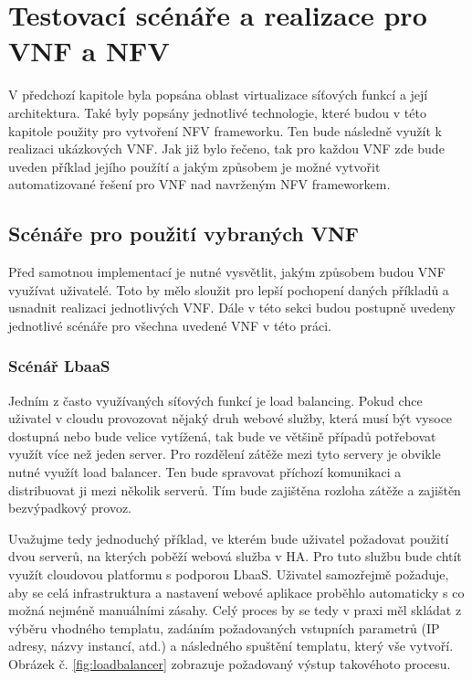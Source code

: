 \chapter{Testovací scénáře a realizace pro VNF a NFV}

V předchozí kapitole byla popsána oblast virtualizace síťových funkcí a její architektura. Také byly popsány jednotlivé technologie, které budou v této kapitole použity pro vytvoření NFV frameworku. Ten bude následně využít k realizaci ukázkových VNF. Jak již bylo řečeno, tak pro každou VNF zde bude uveden příklad jejího použítí a jakým způsobem je možné vytvořit automatizované řešení pro VNF nad navrženým NFV frameworkem.

\section{Scénáře pro použití vybraných VNF}

Před samotnou implementací je nutné vysvětlit, jakým způsobem budou VNF využívat uživatelé. Toto by mělo sloužit pro lepší pochopení daných příkladů a usnadnit realizaci jednotlivých VNF. Dále v této sekci budou postupně uvedeny jednotlivé scénáře pro všechna uvedené VNF v této práci. 

\subsection{Scénář LbaaS}

Jedním z často využívaných síťových funkcí je load balancing. Pokud chce uživatel v cloudu provozovat nějaký druh webové služby, která musí být vysoce dostupná nebo bude velice vytížená, tak bude ve většině případů potřebovat využít více než jeden server. Pro rozdělení zátěže mezi tyto servery je obvikle nutné využít load balancer. Ten bude spravovat příchozí komunikaci a distribuovat ji mezi několik serverů. Tím bude zajištěna rozloha zátěže a zajištěn bezvýpadkový provoz.

Uvažujme tedy jednoduchý příklad, ve kterém bude uživatel požadovat použití dvou serverů, na kterých poběží webová služba v HA. Pro tuto službu bude chtít využít cloudovou platformu s podporou LbaaS. Uživatel samozřejmě požaduje, aby se celá infrastruktura a nastavení webové aplikace proběhlo automaticky s co možná nejméně manuálními zásahy. Celý proces by se tedy v praxi měl skládat z výběru vhodného templatu, zadáním požadovaných vstupních parametrů (IP adresy, názvy instancí, atd.) a následného spuštění templatu, který vše vytvoří. Obrázek č. \ref{fig:loadbalancer} zobrazuje požadovaný výstup takovéhoto procesu.

